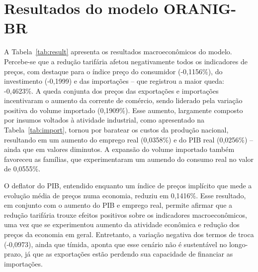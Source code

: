\section{Resultados do modelo ORANIG-BR} \label{sec:resultados}

A Tabela~\ref{tab:result} apresenta os resultados macroeconômicos do modelo. Percebe-se que a redução tarifária afetou negativamente todos os indicadores de preços, com destaque para o índice preço do consumidor (-0,1156\%), do investimento (-0,1999) e das importações -- que registrou a maior queda: -0,4623\%. A queda conjunta dos preços das exportações e importações incentivaram o aumento da corrente de comércio, sendo liderado pela variação positiva do volume importado (0,1909\%). Esse aumento, largamente composto por insumos voltados à atividade industrial, como apresentado na Tabela~\ref{tab:import}, tornou por baratear os custos da produção nacional, resultando em um aumento do emprego real (0,0358\%) e do PIB real (0,0256\%) -- ainda que em valores diminutos. A expansão do volume importado também favoreceu as famílias, que experimentaram um aumendo do consumo real no valor de 0,0555\%.

O deflator do PIB, entendido enquanto um índice de preços implícito que mede a evolução média de preços numa economia, reduziu em 0,1416\%. Esse resultado, em conjunto com o aumento do PIB e emprego real, permite afirmar que a redução tarifária trouxe efeitos positivos sobre os indicadores macroeconômicos, uma vez que se experimentou aumento da atividade econômica e redução dos preços da economia em geral. Entretanto, a variação negativa dos termos de troca (-0,0973), ainda que tímida, aponta que esse cenário não é sustentável no longo-prazo, já que as exportações estão perdendo sua capacidade de financiar as importações.



